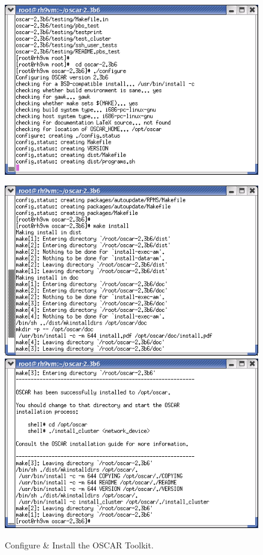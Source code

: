 \begin{figure}[h!]
  \begin{center}
    \centerline{\includegraphics[scale=\imgscale]{figs/sbs-configure-install}}
      \vspace{\imgvskip}
	\centerline{
      \includegraphics[scale=\imgscale]{figs/sbs-make-install-1}
      \hspace{\imghskip}
      \includegraphics[scale=\imgscale]{figs/sbs-make-install-2}
      }
    \caption{Configure \& Install the OSCAR Toolkit.}
    \label{fig:sbs-configure-install}
  \end{center}
\end{figure}

